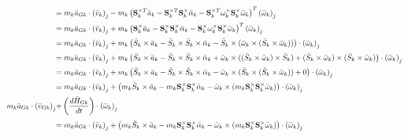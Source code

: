 \documentclass[a4paper,10pt]{article}
\newcommand\scalemath[2]{\scalebox{#1}{\mbox{\ensuremath{\displaystyle #2}}}}
\begin{document}
\begin{align}
 &\scalemath{0.775}{=  m_k \bar{a}_{Gk} \cdot \left(\bar{v}_k\right)_j - m_k \left( \mathbf{S}^{\times T}_k \bar{a}_k -  \mathbf{S}^{\times T}_k \mathbf{S}^{\times}_k \bar{\alpha}_k - \mathbf{S}^{\times T}_k \mathbf{\omega}^{\times}_k \mathbf{S}^{\times}_k \bar{\omega}_k \right)^T  \left(\bar{\omega}_k\right)_j} \nonumber \\
 &\scalemath{0.775}{=  m_k \bar{a}_{Gk} \cdot \left(\bar{v}_k\right)_j + m_k \left( \mathbf{S}^{\times}_k \bar{a}_k -  \mathbf{S}^{\times}_k \mathbf{S}^{\times}_k \bar{\alpha}_k - \mathbf{S}^{\times}_k \mathbf{\omega}^{\times}_k \mathbf{S}^{\times}_k \bar{\omega}_k \right)^T  \left(\bar{\omega}_k\right)_j} \nonumber \\
 &\scalemath{0.775}{=  m_k \bar{a}_{Gk} \cdot \left(\bar{v}_k\right)_j + m_k \left( \bar{S}_k \times \bar{a}_k -  \bar{S}_k \times \bar{S}_k \times \bar{\alpha}_k - \bar{S}_k \times ( \bar{\omega}_k \times ( \bar{S}_k \times \bar{\omega}_k ) ) \right) \cdot  \left(\bar{\omega}_k\right)_j} \nonumber \\
 &\scalemath{0.775}{=  m_k \bar{a}_{Gk} \cdot \left(\bar{v}_k\right)_j + m_k \left( \bar{S}_k \times \bar{a}_k -  \bar{S}_k \times \bar{S}_k \times \bar{\alpha}_k + \bar{\omega}_k \times ( ( \bar{S}_k \times \bar{\omega}_k ) \times  \bar{S}_k ) + ( \bar{S}_k \times \bar{\omega}_k ) \times ( \bar{S}_k \times \bar{\omega}_k )  \right) \cdot  \left(\bar{\omega}_k\right)_j} \nonumber \\
 &\scalemath{0.775}{=  m_k \bar{a}_{Gk} \cdot \left(\bar{v}_k\right)_j + m_k \left( \bar{S}_k \times \bar{a}_k -  \bar{S}_k \times \bar{S}_k \times \bar{\alpha}_k - \bar{\omega}_k \times ( \bar{S}_k \times ( \bar{S}_k \times \bar{\omega}_k ) ) + 0  \right) \cdot  \left(\bar{\omega}_k\right)_j} \nonumber \\
 &\scalemath{0.775}{=  m_k \bar{a}_{Gk} \cdot \left(\bar{v}_k\right)_j + \left( m_k \bar{S}_k \times \bar{a}_k -  m_k \mathbf{S}^{\times}_k \mathbf{S}^{\times}_k \bar{\alpha}_k - \bar{\omega}_k \times (m_k \mathbf{S}^{\times}_k \mathbf{S}^{\times}_k \bar{\omega}_k) \right) \cdot  \left(\bar{\omega}_k\right)_j} \nonumber \\
 \scalemath{0.775}{m_k \bar{a}_{Gk} \cdot \left(\bar{v}_{Gk}\right)_j} &\scalemath{0.775}{ + \left( \frac{d\bar{H}_{Gk}}{dt} \right) \cdot \left( \bar\omega_k \right)_j} \nonumber \\
 &\scalemath{0.775}{=  m_k \bar{a}_{Gk} \cdot \left(\bar{v}_k\right)_j + \left( m_k \bar{S}_k \times \bar{a}_k -  m_k \mathbf{S}^{\times}_k \mathbf{S}^{\times}_k \bar{\alpha}_k - \bar{\omega}_k \times (m_k \mathbf{S}^{\times}_k \mathbf{S}^{\times}_k \bar{\omega}_k) \right) \cdot  \left(\bar{\omega}_k\right)_j} \nonumber \\

\end{align}
\end{document}
